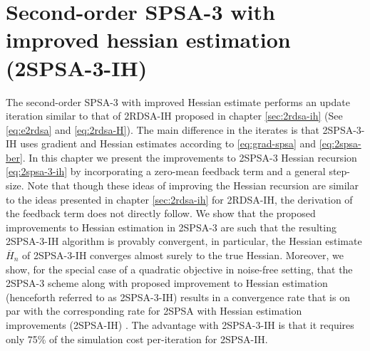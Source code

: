  \chapter{Second-order SPSA-3 with improved hessian estimation (2SPSA-3-IH)}
\label{sec:2spsa-3-ih}
The second-order SPSA-3 with improved Hessian estimate performs an update iteration similar to that of 2RDSA-IH proposed in chapter \ref{sec:2rdsa-ih} (See \eqref{eq:e2rdsa} and \eqref{eq:2rdsa-H}). The main difference in the iterates is that 2SPSA-3-IH uses gradient and Hessian estimates according to \eqref{eq:grad-spsa} and \eqref{eq:2spsa-ber}. In this chapter we present the improvements to 2SPSA-3 Hessian recursion \eqref{eq:2spsa-3-ih} by incorporating a zero-mean feedback term and a general step-size. Note that though these ideas of improving the Hessian recursion are similar to the ideas presented in chapter \ref{sec:2rdsa-ih} for 2RDSA-IH, the derivation of the feedback term does not directly follow. We show that the proposed improvements to Hessian estimation in 2SPSA-3 are such  that the resulting 2SPSA-3-IH algorithm is provably convergent, in particular, the Hessian estimate $\overline H_n$ of 2SPSA-3-IH converges almost surely to the true Hessian. Moreover, we show, for the special case of a quadratic objective in noise-free setting, that the 2SPSA-3 scheme along with proposed improvement to Hessian estimation (henceforth referred to as 2SPSA-3-IH) results in a convergence rate that is on par with the corresponding rate for 2SPSA with Hessian estimation improvements (2SPSA-IH) \cite{spall-jacobian}. The advantage with 2SPSA-3-IH is that it requires only 75\% of the simulation cost per-iteration for 2SPSA-IH.

